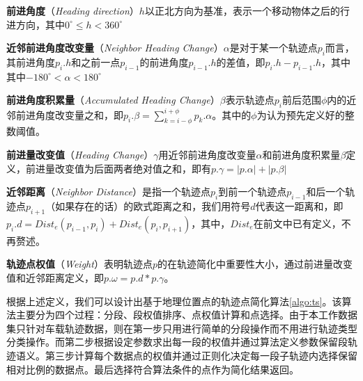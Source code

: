 \theoremstyle{definition}
\begin{definition}
	\textbf{前进角度}（\emph{Heading direction}）$h$以正北方向为基准，表示一个移动物体之后的行进方向，其中$0^\circ\leq h < 360^\circ$
\end{definition}

\theoremstyle{definition}
\begin{definition}
	\textbf{近邻前进角度改变量}（\emph{Neighbor Heading Change}）$\alpha$是对于某一个轨迹点$p_i$而言，其前进角度$p_{i}.h$和之前一点$p_{i-1}$的前进角度$p_{i-1}.h$的差值，即$p_{i}.h-p_{i-1}.h$，其中其中$-180^\circ < \alpha <180^\circ$
\end{definition}

\theoremstyle{definition}
\begin{definition}
	\textbf{前进角度积累量}（\emph{Accumulated Heading Change}）$\beta$表示轨迹点$p_i$前后范围$\phi$内的近邻前进角度改变量之和，即$p_{i}.\beta=\sum_{k=i-\phi}^{i+\phi}p_{k}.\alpha$。其中的$\phi$为认为预先定义好的整数阈值。
\end{definition}

\theoremstyle{definition}
\begin{definition}
	\textbf{前进量改变值}（\emph{Heading Change}）$\gamma$用近邻前进角度改变量$\alpha$和前进角度积累量$\beta$定义，前进量改变值为后面两者绝对值之和，即有$p.\gamma=|p.\alpha|+|p.\beta|$
\end{definition}

\theoremstyle{definition}
\begin{definition}
	\textbf{近邻距离}（\emph{Neighbor Distance}）是指一个轨迹点$p_i$到前一个轨迹点$p_{i-1}$和后一个轨迹点$p_{i+1}$（如果存在的话）的欧式距离之和，我们用符号$d$代表这一距离和，即$p_{i}.d=Dist_e(p_{i-1},p_{i})+Dist_e(p_{i},p_{i+1})$，其中，$Dist_e$在前文中已有定义，不再赘述。
\end{definition}

\theoremstyle{definition}
\begin{definition}
	\textbf{轨迹点权值}（\emph{Weight}）表明轨迹点$p$的在轨迹简化中重要性大小，通过前进量改变值和近邻距离定义，即$p.\omega = p.d * p.\gamma$。
\end{definition}

根据上述定义，我们可以设计出基于地理位置点的轨迹点简化算法\ref{algo:ts}。该算法主要分为四个过程：分段、段权值排序、点权值计算和点选择。由于本工作数据集只针对车载轨迹数据，则在第一步只用进行简单的分段操作而不用进行轨迹类型分类操作。而第二步根据设定参数求出每一段的权值并通过算法定义参数保留段轨迹语义。第三步计算每个数据点的权值并通过正则化决定每一段子轨迹内选择保留相对比例的数据点。最后选择符合算法条件的点作为简化结果返回。

